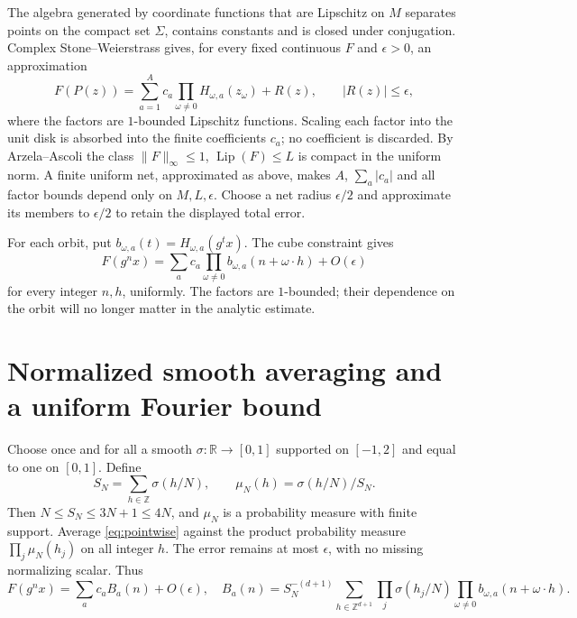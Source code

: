\documentclass[11pt]{article}
\newcommand{\R}{\mathbb R}\newcommand{\Z}{\mathbb Z}
\begin{document}
The algebra generated by coordinate functions that are Lipschitz on
$M$ separates points on the compact set $\Sigma$, contains constants
and is closed under conjugation. Complex Stone--Weierstrass gives,
for every fixed continuous $F$ and $\epsilon>0$, an approximation
\[
 F(P(z))=\sum_{a=1}^A c_a\prod_{\omega\ne0}H_{\omega,a}(z_\omega)
                 +R(z),\qquad |R(z)|\leq\epsilon,
\]
where the factors are $1$-bounded Lipschitz functions. Scaling each
factor into the unit disk is absorbed into the finite coefficients
$c_a$; no coefficient is discarded. By Arzela--Ascoli the class
$\|F\|_\infty\leq1$, $\operatorname{Lip}(F)\leq L$ is compact
in the uniform norm. A finite uniform net, approximated as above,
makes $A$, $\sum_a|c_a|$ and all factor bounds depend only on
$M,L,\epsilon$. Choose a net radius $\epsilon/2$ and approximate
its members to $\epsilon/2$ to retain the displayed total error.

For each orbit, put
$b_{\omega,a}(t)=H_{\omega,a}(g^tx)$. The cube constraint gives
\begin{equation}\label{eq:pointwise}
 F(g^nx)=\sum_a c_a\prod_{\omega\ne0}
 b_{\omega,a}(n+\omega\cdot h)+O(\epsilon)
\end{equation}
for every integer $n,h$, uniformly. The factors are $1$-bounded;
their dependence on the orbit will no longer matter in the analytic
estimate.

\section{Normalized smooth averaging and a uniform Fourier bound}

Choose once and for all a smooth $\sigma:\R\to[0,1]$ supported on
$[-1,2]$ and equal to one on $[0,1]$. Define
\[
 S_N=\sum_{h\in\Z}\sigma(h/N),\qquad
 \mu_N(h)=\sigma(h/N)/S_N.
\]
Then $N\leq S_N\leq3N+1\leq4N$, and $\mu_N$ is a probability
measure with finite support. Average \eqref{eq:pointwise} against
the product probability measure $\prod_j\mu_N(h_j)$ on all
integer $h$. The error remains at most $\epsilon$, with no missing
normalizing scalar. Thus
\[
 F(g^nx)=\sum_a c_a B_a(n)+O(\epsilon),\quad
 B_a(n)=S_N^{-(d+1)}\sum_{h\in\Z^{d+1}}
   \prod_j\sigma(h_j/N)\prod_{\omega\ne0}
                  b_{\omega,a}(n+\omega\cdot h).
\]
\end{document}
